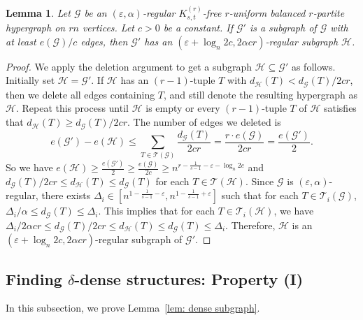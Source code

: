 \documentclass[11pt]{article}
\newtheorem{lem}[dfn]{Lemma}
\begin{document}
\begin{lem} \label{coro: regular graph subgraph}
Let $\mathcal G$  be   an $(\varepsilon,\alpha)$-regular $K_{s,t}^{(r)}$-free $r$-uniform balanced $r$-partite hypergraph on $rn$ vertices.
Let $c>0$ be a constant.
If $\mathcal G'$ is a subgraph of $\mathcal G$ with at least $e(\mathcal G)/c$ edges,
then $\mathcal G'$ has an $(\varepsilon +\log_n{2c}, 2\alpha cr)$-regular subgraph $\mathcal H$.
\end{lem}
\begin{proof}
We apply the deletion argument to get a subgraph $\mathcal H\subseteq \mathcal G'$ as follows.
Initially set $\mathcal H= \mathcal G'$.
If $\mathcal H$ has an $(r-1)$-tuple $T$ with $d_{\mathcal H}(T)<d_{\mathcal G}(T)/2cr$,
then we delete all edges containing $T$, and still denote the resulting hypergraph as $\mathcal H$.
Repeat this process until $ \mathcal H$ is empty or every $(r-1)$-tuple $T$ of $\mathcal H$ satisfies that $d_{\mathcal H}(T)\geq d_{\mathcal G}(T)/2cr$.
The number of edges we deleted is
$$e(\mathcal G')-e(\mathcal H)\le \sum_{ T\in \mathcal T(\mathcal G) } \frac{ d_{\mathcal G}(T)}{2cr} = \frac{r\cdot e(\mathcal G)}{2cr} = \frac{e(\mathcal G')}{2}.$$
So we have $e(\mathcal H)\ge \frac{e(\mathcal G')}{2}\ge \frac{e(\mathcal G )}{2c} \ge n^{r-\frac{1}{s-1}-   \varepsilon - \log_n{2c}}$  and $d_{\mathcal G}(T)/2cr \le  d_{\mathcal H}(T) \le d_{\mathcal G}(T)$ for each $T\in \mathcal T (\mathcal H)$.
Since $\mathcal G$ is $(\varepsilon,\alpha)$-regular,
there exists $\Delta_i\in [n^{1-\frac{1}{s-1}-\varepsilon},n^{1-\frac{1}{s-1}+\varepsilon}]$
such that for each $T\in \mathcal T_i(\mathcal G)$, $\Delta_i/\alpha \le d_{\mathcal G}(T)\le \Delta_i$.
This implies that for each $T\in \mathcal T_i (\mathcal H)$, we have
$\Delta_i/2\alpha cr \le d_{\mathcal G}(T)/2cr \le  d_{\mathcal H}(T) \le d_{\mathcal G}(T)\le \Delta_i$.
Therefore, $\mathcal H$ is an $(\varepsilon +\log_n{2c},  2\alpha cr)$-regular subgraph of $\mathcal G'$.
\end{proof}



\subsection{Finding $\delta$-dense structures: Property (I)}
In this subsection, we prove Lemma~\ref{lem: dense subgraph}.
\end{document}
